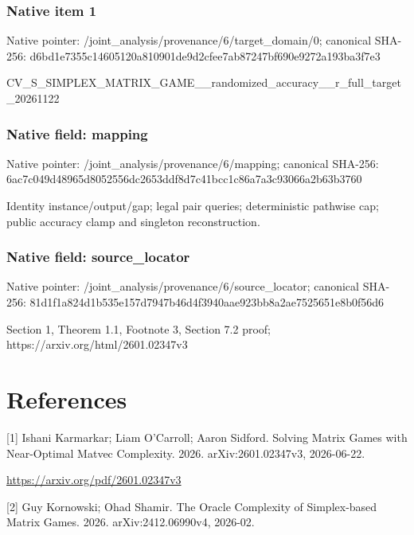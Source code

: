 \documentclass[10pt,a4paper]{article}
\begin{document}
\subsubsection{Native item 1}


Native pointer: /joint\_analysis/provenan\allowbreak{}ce/6/target\_domain/0; canonical SHA-256: d6bd1e7355c14605120a8109\allowbreak{}01de9d2cfee7ab87247bf690\allowbreak{}e9272a193ba3f7e3


CV\_S\_SIMPLEX\_MATRIX\_GAME\allowbreak{}\_\_randomized\_accuracy\_\_r\allowbreak{}\_full\_target\_20261122


\subsubsection{Native field: mapping}


Native pointer: /joint\_analysis/provenance/6/mapping; canonical SHA-256: 6ac7c049d48965d8052556dc\allowbreak{}2653ddf8d7c41bcc1c86a7a3\allowbreak{}c93066a2b63b3760


Identity instance/output/gap; legal pair queries; deterministic pathwise cap; public accuracy clamp and singleton reconstruction.


\subsubsection{Native field: source\_locator}


Native pointer: /joint\_analysis/provenan\allowbreak{}ce/6/source\_locator; canonical SHA-256: 81d1f1a824d1b535e157d794\allowbreak{}7b46d4f3940aae923bb8a2ae\allowbreak{}7525651e8b0f56d6


Section 1, Theorem 1.1, Footnote 3, Section 7.2 proof; https://arxiv.org/html/2601.02347v3


\section{References}


[1] Ishani Karmarkar; Liam O'Carroll; Aaron Sidford. Solving Matrix Games with Near-Optimal Matvec Complexity. 2026. arXiv:2601.02347v3, 2026-06-22.



\url{https://arxiv.org/pdf/2601.02347v3}



[2] Guy Kornowski; Ohad Shamir. The Oracle Complexity of Simplex-based Matrix Games. 2026. arXiv:2412.06990v4, 2026-02.
\end{document}
